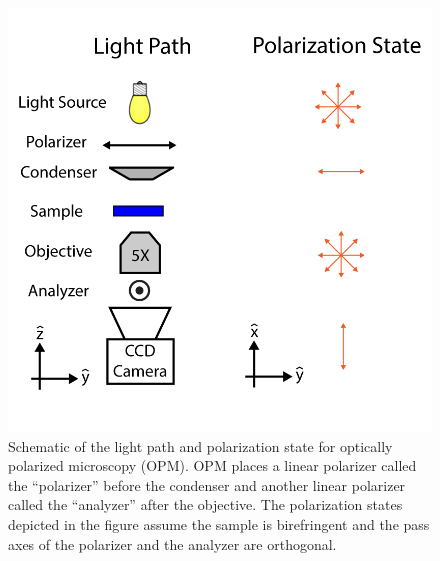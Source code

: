 \begin{figure}[h]
  \centering
  \includegraphics{figures/C2/Ch2-Figs_OPMSchem.png}
  \caption{Schematic of the light path and polarization state for optically polarized microscopy (OPM). OPM places a linear polarizer called the ``polarizer'' before the condenser and another linear polarizer called the ``analyzer'' after the objective. The polarization states depicted in the figure assume the sample is birefringent and the pass axes of the polarizer and the analyzer are orthogonal.}\label{f:2-OPMSchem}
\end{figure}

